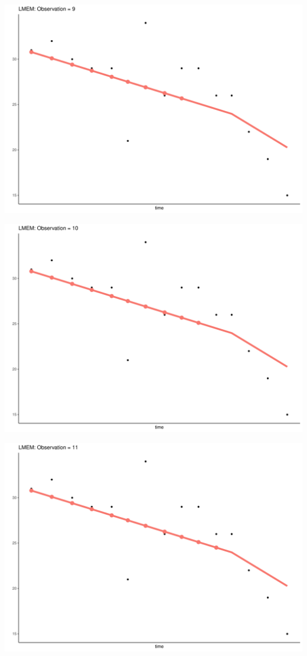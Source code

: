 \documentclass[
  ignorenonframetext,
]{beamer}
\begin{document}
\begin{frame}{}
\protect\hypertarget{section-8}{}
\includegraphics{Prez4_files/figure-beamer/unnamed-chunk-13-9.pdf}
\end{frame}

\begin{frame}{}
\protect\hypertarget{section-9}{}
\includegraphics{Prez4_files/figure-beamer/unnamed-chunk-13-10.pdf}
\end{frame}

\begin{frame}{}
\protect\hypertarget{section-10}{}
\includegraphics{Prez4_files/figure-beamer/unnamed-chunk-13-11.pdf}
\end{frame}
\end{document}
